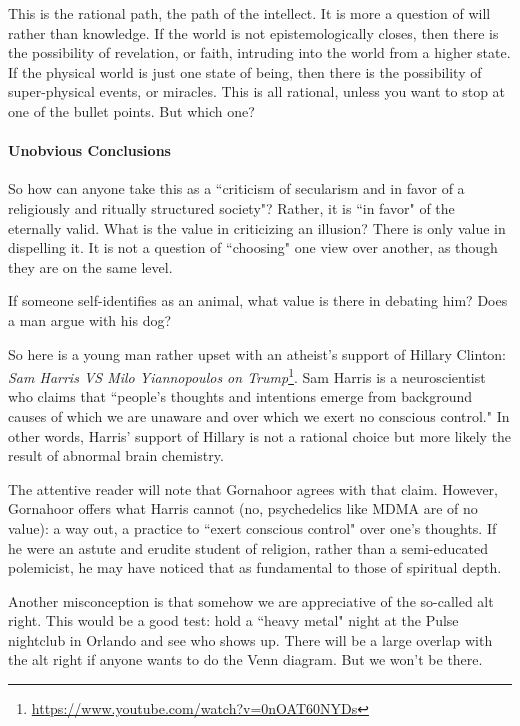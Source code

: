 This is the rational path, the path of the intellect. It is more a question of will rather than knowledge. If the world is not epistemologically closes, then there is the possibility of revelation, or faith, intruding into the world from a higher state. If the physical world is just one state of being, then there is the possibility of super-physical events, or miracles. This is all rational, unless you want to stop at one of the bullet points. But which one?

\paragraph{Unobvious Conclusions}
So how can anyone take this as a ``criticism of secularism and in favor of a religiously and ritually structured society"? Rather, it is ``in favor" of the eternally valid. What is the value in criticizing an illusion? There is only value in dispelling it. It is not a question of ``choosing" one view over another, as though they are on the same level.

If someone self-identifies as an animal, what value is there in debating him? Does a man argue with his dog?

So here is a young man rather upset with an atheist's support of Hillary Clinton: \textit{Sam Harris VS Milo Yiannopoulos on Trump}\footnote{\url{https://www.youtube.com/watch?v=0nOAT60NYDs}}. Sam Harris is a neuroscientist who claims that ``people's thoughts and intentions emerge from background causes of which we are unaware and over which we exert no conscious control." In other words, Harris' support of Hillary is not a rational choice but more likely the result of abnormal brain chemistry.

The attentive reader will note that Gornahoor agrees with that claim. However, Gornahoor offers what Harris cannot (no, psychedelics like MDMA are of no value): a way out, a practice to ``exert conscious control" over one's thoughts. If he were an astute and erudite student of religion, rather than a semi-educated polemicist, he may have noticed that as fundamental to those of spiritual depth.

Another misconception is that somehow we are appreciative of the so-called alt right. This would be a good test: hold a ``heavy metal" night at the Pulse nightclub in Orlando and see who shows up. There will be a large overlap with the alt right if anyone wants to do the Venn diagram. But we won't be there.



